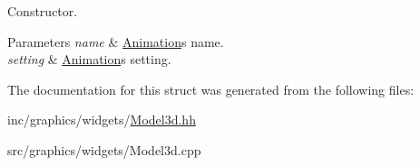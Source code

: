 Constructor. 


\begin{DoxyParams}{Parameters}
{\em name} & \hyperlink{structModel3d_1_1Animation}{Animation}\textquotesingle{}s name. \\
\hline
{\em setting} & \hyperlink{structModel3d_1_1Animation}{Animation}\textquotesingle{}s setting. \\
\hline
\end{DoxyParams}


The documentation for this struct was generated from the following files\+:\begin{DoxyCompactItemize}
\item 
inc/graphics/widgets/\hyperlink{Model3d_8hh}{Model3d.\+hh}\item 
src/graphics/widgets/Model3d.\+cpp\end{DoxyCompactItemize}
